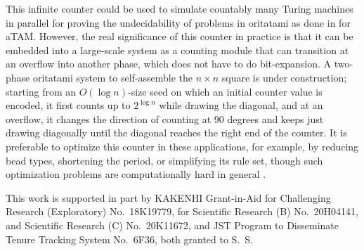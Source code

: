 \documentclass[twocolumn]{svjour3}
\begin{document}
This infinite counter could be used to simulate countably many Turing machines in parallel for proving the undecidability of problems in oritatami as done in \cite{BrChDoKaSe2013,LathropLPS2011} for aTAM. 
However, the real significance of this counter in practice is that it can be embedded into a large-scale system as a counting module that can transition at an overflow into another phase, which does not have to do bit-expansion. 
A two-phase oritatami system to self-assemble the $n \times n$ square is under construction; starting from an $O(\log n)$-size seed on which an initial counter value is encoded, it first counts up to $2^{\log n}$ while drawing the diagonal, and at an overflow, it changes the direction of counting at 90 degrees and keeps just drawing diagonally until the diagonal reaches the right end of the counter. 
It is preferable to optimize this counter in these applications, for example, by reducing bead types, shortening the period, or simplifying its rule set, though such optimization problems are computationally hard in general \cite{HanKim2019,OtaSeki2017}.

\begin{acknowledgements}
This work is supported in part by 
KAKENHI Grant-in-Aid for Challenging Research (Exploratory) No.~18K19779, for  Scientific Research (B) No.~20H04141, and Scientific Research (C) No.~20K11672, and JST Program to Disseminate Tenure Tracking System No.~6F36, both granted to S.~S.
\end{acknowledgements}
\end{document}
